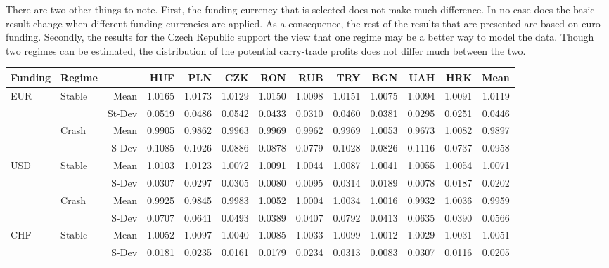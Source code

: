 \documentclass[12pt, a4paper, oneside]{article}\usepackage[]{graphicx}\usepackage[]{color}
\begin{document}
There are two other things to note.  First, the funding currency that is selected does not make much difference.   In no case does the basic result change when different funding currencies are applied. As a consequence, the rest of the results that are presented are based on euro-funding.  Secondly, the results for the Czech Republic support the view that one regime may be a better way to model the data. Though two regimes can be estimated, the distribution of the potential carry-trade profits does not differ much between the two. 

\begin{sidewaystable}[p]
\begin{threeparttable}
\centering
\begin{tabular}{llrrrrrrrrrrr}
  \hline
 Funding & Regime& & HUF & PLN & CZK & RON & RUB & TRY & BGN & UAH & HRK & Mean \\ 
  \hline
  \hline
\multirow{4}{*}{EUR}& \multirow{2}{*}{Stable}& Mean & 1.0165 & 1.0173 & 1.0129 & 1.0150 & 1.0098 & 1.0151 & 1.0075 & 1.0094 & 1.0091 & 1.0119 \\ 
&&St-Dev& 0.0519 & 0.0486 & 0.0542 & 0.0433 & 0.0310 & 0.0460 & 0.0381 & 0.0295 & 0.0251 & 0.0446 \\ 
&\multirow{2}{*}{Crash}& Mean & 0.9905 & 0.9862 & 0.9963 & 0.9969 & 0.9962 & 0.9969 & 1.0053 & 0.9673 & 1.0082 & 0.9897 \\ 
 &&S-Dev & 0.1085 & 0.1026 & 0.0886 & 0.0878 & 0.0779 & 0.1028 & 0.0826 & 0.1116 & 0.0737 & 0.0958 \\ 
\hline
\multirow{4}{*}{USD}&\multirow{2}{*}{Stable}&Mean& 1.0103 & 1.0123 & 1.0072 & 1.0091 & 1.0044 & 1.0087 & 1.0041 & 1.0055 & 1.0054 & 1.0071 \\ 
&&S-Dev& 0.0307 & 0.0297 & 0.0305 & 0.0080 & 0.0095 & 0.0314 & 0.0189 & 0.0078 & 0.0187 & 0.0202 \\ 
  &\multirow{2}{*}{Crash}&Mean& 0.9925 & 0.9845 & 0.9983 & 1.0052 & 1.0004 & 1.0034 & 1.0016 & 0.9932 & 1.0036 & 0.9959 \\ 
   & & S-Dev & 0.0707 & 0.0641 & 0.0493 & 0.0389 & 0.0407 & 0.0792 & 0.0413 & 0.0635 & 0.0390 & 0.0566 \\ 
\hline
\multirow{4}{*}{CHF}& \multirow{2}{*}{Stable}&Mean& 1.0052 & 1.0097 & 1.0040 & 1.0085 & 1.0033 & 1.0099 & 1.0012 & 1.0029 & 1.0031 & 1.0051 \\ 
   & & S-Dev & 0.0181 & 0.0235 & 0.0161 & 0.0179 & 0.0234 & 0.0313 & 0.0083 & 0.0307 & 0.0116 & 0.0205 \\ 

\end{tabular}
\end{threeparttable}
\end{sidewaystable}
\end{document}
